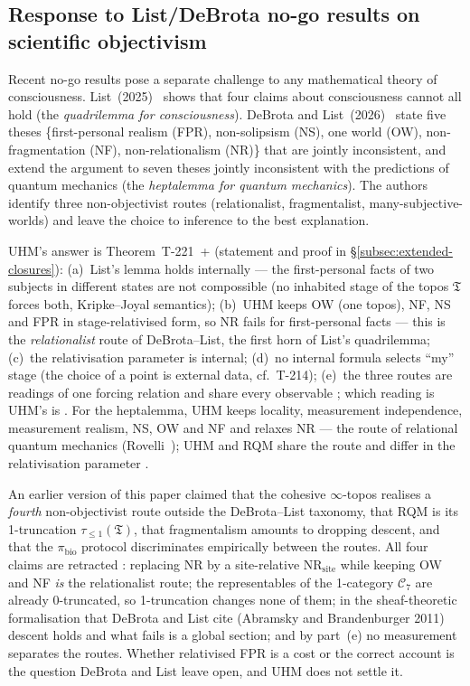 \subsection{Response to List/DeBrota no-go results on scientific objectivism}
\label{subsec:list-debrota-response}

Recent no-go results pose a separate challenge to any mathematical
theory of consciousness. List~(2025)~\cite{list2025quadrilemma}
shows that four claims about consciousness cannot all hold (the
\emph{quadrilemma for consciousness}).
DeBrota and List~(2026)~\cite{debrotalist2026preprint} state five theses
\{first-personal realism (FPR), non-solipsism (NS), one world (OW),
non-fragmentation (NF), non-relationalism (NR)\} that are jointly
inconsistent, and~\cite{debrota2026heptalemma} extend the argument to seven
theses jointly inconsistent with the predictions of quantum mechanics (the
\emph{heptalemma for quantum mechanics}). The authors identify three
non-objectivist routes (relationalist, fragmentalist,
many-subjective-worlds) and leave the choice to inference to the best
explanation.

UHM's answer is Theorem~T-221~+ (statement and proof in
\S\ref{subsec:extended-closures}): (a)~List's lemma holds internally --- the
first-personal facts of two subjects in different states are not compossible
(no inhabited stage of the topos $\mathfrak T$ forces both, Kripke--Joyal
semantics); (b)~UHM keeps OW (one topos), NF, NS and FPR in
stage-relativised form, so NR fails for first-personal facts --- this is the
\emph{relationalist} route of DeBrota--List, the first horn of List's
quadrilemma; (c)~the relativisation parameter is internal; (d)~no internal
formula selects ``my'' stage (the choice of a point is external data,
cf.\ T-214); (e)~the three routes are readings of one forcing relation and
share every observable ; which reading is UHM's is .
For the heptalemma, UHM keeps locality, measurement independence,
measurement realism, NS, OW and NF and relaxes NR --- the route of
relational quantum mechanics (Rovelli~\cite{rovelli1996rqm}); UHM and RQM
share the route and differ in the relativisation parameter .

An earlier version of this paper claimed that the cohesive $\infty$-topos
realises a \emph{fourth} non-objectivist route outside the DeBrota--List
taxonomy, that RQM is its 1-truncation $\tau_{\leq 1}(\mathfrak T)$, that
fragmentalism amounts to dropping descent, and that the $\pi_{\mathrm{bio}}$
protocol discriminates empirically between the routes. All four claims are
retracted \status{$\times$}: replacing NR by a site-relative
$\mathrm{NR}_{\mathrm{site}}$ while keeping OW and NF \emph{is} the
relationalist route; the representables of the 1-category $\mathcal C_7$ are
already 0-truncated, so 1-truncation changes none of them; in the
sheaf-theoretic formalisation that DeBrota and List cite (Abramsky and
Brandenburger 2011) descent holds and what fails is a global section; and by
part~(e) no measurement separates the routes. Whether relativised FPR is a
cost or the correct account is the question DeBrota and List leave open, and
UHM does not settle it.

